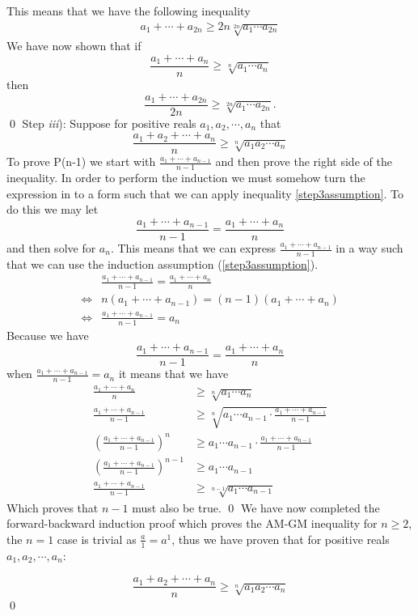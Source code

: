 \documentclass{article}
\begin{document}
	This means that we have the following inequality
	\begin{align*}
		a_1 + \cdots + a_{2n} \geq 2n\sqrt[2n]{a_1\cdots a_{2n}}
	\end{align*}
	We have now shown that if 
	$$\frac{a_1+ \cdots + a_n}{n} \geq \sqrt[n]{a_1\cdots a_n}$$ 
	then 
	$$\frac{a_1+ \cdots + a_{2n}}{2n} \geq \sqrt[2n]{a_1\cdots a_{2n}}.$$ \qed
	\newline
	Step \textit{iii}): Suppose for positive reals $a_1,a_2, \cdots, a_n$ that
	\begin{equation}
		\frac{a_1+a_2+ \cdots + a_n}{n} \geq \sqrt[n]{a_1a_2 \cdots a_n}
		\label{step3assumption}
	\end{equation}
	To prove P(n-1) we start with $\frac{a_1+\cdots +a_{n-1}}{n-1}$ and then prove the right side of the inequality. In order to perform the induction we must somehow turn the expression in to a form such that we can apply inequality \ref{step3assumption}. To do this we may let $$\frac{a_1+\cdots +a_{n-1}}{n-1}=\frac{a_1+\cdots +a_n}{n}$$ 
	and then solve for $a_n$. This means that we can express $\frac{a_1+\cdots +a_{n-1}}{n-1}$ in a way such that we can use the induction assumption (\ref{step3assumption}).
	\begin{align*}
		&\frac{a_1+\cdots +a_{n-1}}{n-1}=\frac{a_1+\cdots +a_n}{n} \\
		\iff& n(a_1+\cdots +a_{n-1})=(n-1)(a_1+\cdots +a_n) \\
		\iff& \frac{a_1+\cdots +a_{n-1}}{n-1}=a_n
	\end{align*}
	Because we have $$\frac{a_1+\cdots +a_{n-1}}{n-1}=\frac{a_1+\cdots +a_n}{n}$$ when $\frac{a_1+\cdots +a_{n-1}}{n-1}=a_n$ it means that we have
	\begin{align*}
		\frac{a_1+\cdots +a_{n}}{n} &\geq \sqrt[n]{a_1\cdots a_n} \\
		\frac{a_1+\cdots +a_{n-1}}{n-1} &\geq \sqrt[n]{a_1\cdots a_{n-1} \cdot \frac{a_1+\cdots +a_{n-1}}{n-1}}\\
		\left(\frac{a_1+\cdots +a_{n-1}}{n-1}\right)^n &\geq a_1\cdots a_{n-1} \cdot \frac{a_1+\cdots +a_{n-1}}{n-1} \\
		\left(\frac{a_1+\cdots +a_{n-1}}{n-1}\right)^{n-1} &\geq a_1\cdots a_{n-1}\\
		\frac{a_1+\cdots +a_{n-1}}{n-1} &\geq \sqrt[n-1]{a_1\cdots a_{n-1}}
	\end{align*}
	Which proves that $n-1$ must also be true. \qed
	\newline
	We have now completed the forward-backward induction proof which proves the AM-GM inequality for $n \geq 2$, the $n=1$ case is trivial as $\frac{a}{1}=a^1$, thus we have proven that for positive reals $a_1,a_2, \cdots, a_n$:
	
	\[ \frac{a_1+a_2+ \cdots + a_n}{n} \geq \sqrt[n]{a_1a_2 \cdots a_n}  \tag*{for $n \geq 1$}   \]
	\qed
\end{document}
